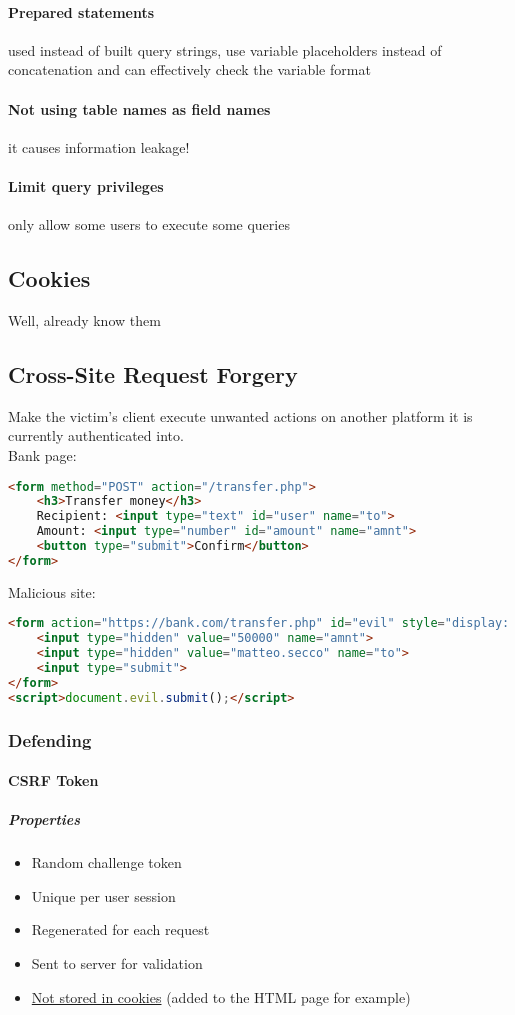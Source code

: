 \documentclass{article}
\begin{document}
\paragraph{Prepared statements} used instead of built query strings, use variable placeholders instead of concatenation and can effectively check the variable format
\paragraph{Not using table names as field names} it causes information leakage!
\paragraph{Limit query privileges} only allow some users to execute some queries

\subsection{Cookies}
Well, already know them

\subsection{Cross-Site Request Forgery}
Make the victim's client execute unwanted actions on another platform it is currently authenticated into.\\
Bank page:
\begin{lstlisting}[language=HTML]
<form method="POST" action="/transfer.php">
	<h3>Transfer money</h3>
	Recipient: <input type="text" id="user" name="to">
	Amount: <input type="number" id="amount" name="amnt">
	<button type="submit">Confirm</button>
</form>
\end{lstlisting}
Malicious site:
\begin{lstlisting}[language=HTML]
<form action="https://bank.com/transfer.php" id="evil" style="display: none;" method="POST">
	<input type="hidden" value="50000" name="amnt">
	<input type="hidden" value="matteo.secco" name="to">
	<input type="submit">
</form>
<script>document.evil.submit();</script>
\end{lstlisting}
\subsubsection{Defending}
\paragraph{CSRF Token}
\subparagraph{Properties}
\begin{itemize}
\item Random challenge token
\item Unique per user session
\item Regenerated for each request
\item Sent to server for validation
\item \underline{Not stored in cookies} (added to the HTML page for example)
\end{itemize}
\end{document}
